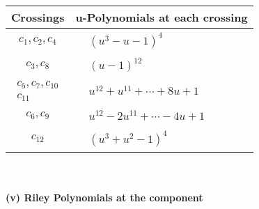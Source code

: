 \documentclass[1p]{elsarticle_modified}
\theoremstyle{definition}
\begin{document}
\begin{tabular}{m{50pt}|m{274pt}}
Crossings & \hspace{64pt}u-Polynomials at each crossing \\
\hline $$\begin{aligned}c_{1},c_{2},c_{4}\end{aligned}$$&$\begin{aligned}
&(u^3- u-1)^4
\end{aligned}$\\
\hline $$\begin{aligned}c_{3},c_{8}\end{aligned}$$&$\begin{aligned}
&(u-1)^{12}
\end{aligned}$\\
\hline $$\begin{aligned}c_{5},c_{7},c_{10}\\c_{11}\end{aligned}$$&$\begin{aligned}
&u^{12}+u^{11}+\cdots+8 u+1
\end{aligned}$\\
\hline $$\begin{aligned}c_{6},c_{9}\end{aligned}$$&$\begin{aligned}
&u^{12}-2 u^{11}+\cdots-4 u+1
\end{aligned}$\\
\hline $$\begin{aligned}c_{12}\end{aligned}$$&$\begin{aligned}
&(u^3+u^2-1)^4
\end{aligned}$\\
\hline
\end{tabular}\\~\\
\newpage\renewcommand{\arraystretch}{1}
\flushleft \textbf{(v) Riley Polynomials at the component}\newline \\
\end{document}
